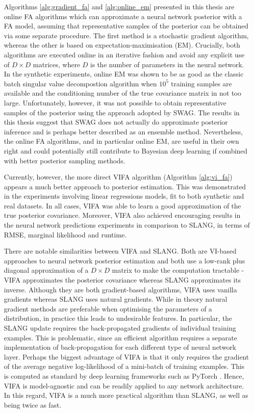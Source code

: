 \documentclass[msc,deptreport.inf]{infthesis} %
\begin{document}
Algorithms \ref{alg:gradient_fa} and \ref{alg:online_em} presented in this thesis are online FA algorithms which can approximate a neural network posterior with a FA model, assuming that representative samples of the posterior can be obtained via some separate procedure. The first method is a stochastic gradient algorithm, whereas the other is based on expectation-maximisation (EM). Crucially, both algorithms are executed online in an iterative fashion and avoid any explicit use of $D \times D$ matrices, where $D$ is the number of parameters in the neural network. In the synthetic experiments, online EM was shown to be as good as the classic batch singular value decompostion algorithm when $10^5$ training samples are available and the conditioning number of the true covariance matrix in not too large. Unfortunately, however, it was not possible to obtain representative samples of the posterior using the approach adopted by SWAG. The results in this thesis suggest that SWAG does not actually do approximate posterior inference and is perhaps better described as an ensemble method. Nevertheless, the online FA algorithms, and in particular online EM, are useful in their own right and could potentially still contribute to Bayesian deep learning if combined with better posterior sampling methods. 

Currently, however, the more direct VIFA algorithm (Algorithm \ref{alg:vi_fa}) appears a much better approach to posterior estimation. This was demonstrated in the experiments involving linear regressions models, fit to both synthetic and real datasets. In all cases, VIFA was able to learn a good approximation of the true posterior covariance. Moreover, VIFA also achieved encouraging results in the neural network predictions experiments in comparison to SLANG, in terms of RMSE, marginal likelihood and runtime. 

There are notable similarities between VIFA and SLANG. Both are VI-based approaches to neural network posterior estimation and both use a low-rank plus diagonal approximation of a $D \times D$ matrix to make the computation tractable - VIFA approximates the posterior covariance whereas SLANG approximates its inverse. Although they are both gradient-based algorithms, VIFA uses vanilla gradients whereas SLANG uses natural gradients. While in theory natural gradient methods are preferable when optimising the parameters of a distribution, in practice this leads to undesirable features. In particular, the SLANG update requires the back-propagated gradients of individual training examples. This is problematic, since an efficient algorithm requires a separate implementation of back-propagation for each different type of neural network layer. Perhaps the biggest advantage of VIFA is that it only requires the gradient of the average negative log-likelihood of a mini-batch of training examples. This is computed as standard by deep learning frameworks such as PyTorch \cite{paszke2019}. Hence, VIFA is model-agnostic and can be readily applied to any network architecture. In this regard, VIFA is a much more practical algorithm than SLANG, as well as being twice as fast.
\end{document}
